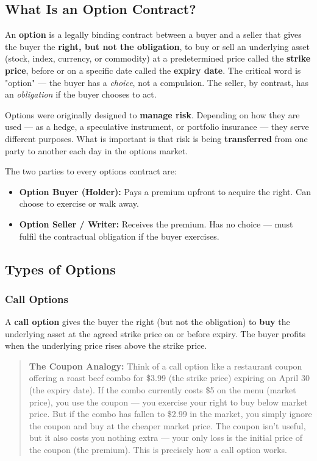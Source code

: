 \documentclass[12pt,openany]{book}
\begin{document}
\subsection{What Is an Option Contract?}

An \textbf{option} is a legally binding contract between a buyer and a seller that gives the buyer the \textbf{right, but not the obligation}, to buy or sell an underlying asset (stock, index, currency, or commodity) at a predetermined price called the \textbf{strike price}, before or on a specific date called the \textbf{expiry date}. The critical word is "option" — the buyer has a \emph{choice}, not a compulsion. The seller, by contrast, has an \emph{obligation} if the buyer chooses to act.

Options were originally designed to \textbf{manage risk}. Depending on how they are used — as a hedge, a speculative instrument, or portfolio insurance — they serve different purposes. What is important is that risk is being \textbf{transferred} from one party to another each day in the options market.

The two parties to every options contract are:

\begin{itemize}[leftmargin=*]
    \item \textbf{Option Buyer (Holder):} Pays a premium upfront to acquire the right. Can choose to exercise or walk away.
    \item \textbf{Option Seller / Writer:} Receives the premium. Has no choice — must fulfil the contractual obligation if the buyer exercises.
\end{itemize}


\subsection{Types of Options}

\subsubsection{Call Options}

A \textbf{call option} gives the buyer the right (but not the obligation) to \textbf{buy} the underlying asset at the agreed strike price on or before expiry. The buyer profits when the underlying price rises above the strike price.

\begin{quote}
\textbf{The Coupon Analogy:} Think of a call option like a restaurant coupon offering a roast beef combo for \$3.99 (the strike price) expiring on April 30 (the expiry date). If the combo currently costs \$5 on the menu (market price), you use the coupon — you exercise your right to buy below market price. But if the combo has fallen to \$2.99 in the market, you simply ignore the coupon and buy at the cheaper market price. The coupon isn't useful, but it also costs you nothing extra — your only loss is the initial price of the coupon (the premium). This is precisely how a call option works.
\end{quote}
\end{document}
